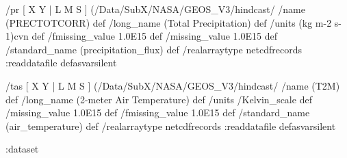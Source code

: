 \begin{ingrid}
    
 /pr{                                                                %
[ X Y | L M S ] (/Data/SubX/NASA/GEOS_V3/hindcast/%
/name (PRECTOTCORR) def
 /long_name (Total Precipitation) def
 /units (kg m-2 s-1)cvn def
 /fmissing_value 1.0E15 def
 /missing_value 1.0E15 def
 /standard_name (precipitation_flux) def
 /realarraytype netcdfrecords :readdatafile
}defasvarsilent

 /tas{
[ X Y | L M S ] (/Data/SubX/NASA/GEOS_V3/hindcast/%
/name (T2M) def
 /long_name (2-meter Air Temperature) def
 /units /Kelvin_scale def
 /missing_value 1.0E15 def
 /fmissing_value 1.0E15 def
 /standard_name (air_temperature) def
 /realarraytype netcdfrecords :readdatafile
}defasvarsilent

:dataset
\end{ingrid}

